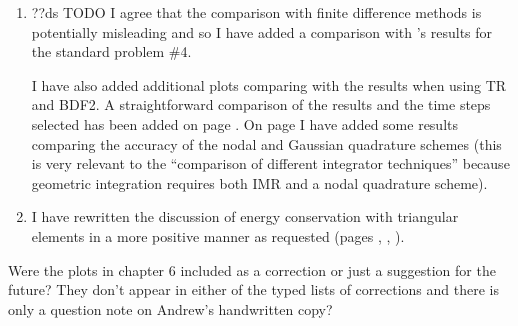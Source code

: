 \documentclass[12pt,a4paper,pdftex]{article}
\begin{document}
\begin{enumerate}
\item ??ds TODO
I agree that the comparison with finite difference methods is potentially misleading and so I have added a comparison with \nmag's results for the \mumag standard problem \#4.

I have also added additional plots comparing with the results when using TR and BDF2.
A straightforward comparison of the results and the time steps selected has been added on page \pageref{more-mumag4-correction-1}.
On page \pageref{more-mumag4-correction-2} I have added some results comparing the accuracy of the nodal and Gaussian quadrature schemes (this is very relevant to the ``comparison of different integrator techniques'' because geometric integration requires both IMR and a nodal quadrature scheme).

\item I have rewritten the discussion of energy conservation with triangular elements in a more positive manner as requested (pages \pageref{sec:triangular-meshes}, \pageref{sec:numer-experiments-conclusions}, \pageref{sec:future-work}).

\end{enumerate}

Were the plots in chapter 6 included as a correction or just a suggestion for the future? They don't appear in either of the typed lists of corrections and there is only a question note on Andrew's handwritten copy?
\end{document}
